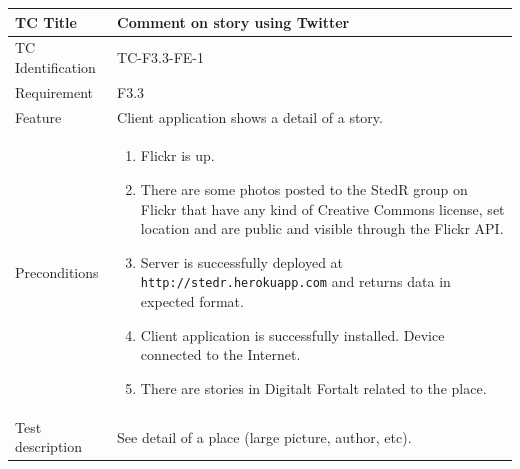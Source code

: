 \documentclass[11pt]{book}
\begin{document}
\begin{table}
  \begin{tabular}{| p{3cm} | p{9.5cm} |} \hline 
    TC Title              & Comment on story using Twitter \\ \hline 
    TC Identification     & TC-F3.3-FE-1 \\ \hline 
    Requirement           & F3.3 \\ \hline 
    Feature               & Client application shows a detail of a story. \\ \hline 
    Preconditions         & \begin{enumerate}
                              \item Flickr is up.
                              \item There are some photos posted to the StedR group on Flickr that have any kind of
                               Creative Commons license, set location and are public and visible through the Flickr API.
                              \item Server is successfully deployed at \texttt{http://stedr.herokuapp.com} and returns data in expected format.
                              \item Client application is successfully installed. Device connected to the Internet.
                              \item There are stories in Digitalt Fortalt related to the place.
                            \end{enumerate} \\ \hline 

    Test description      & See detail of a place (large picture, author, etc).


\end{tabular}
\end{table}
\end{document}
